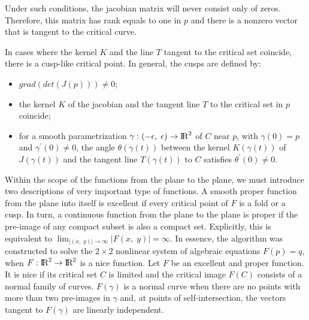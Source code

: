 \documentclass[journal=iecred,manuscript=article]{achemso}
\theoremstyle{definition}
\theoremstyle{remark}
\begin{document}
\noindent Under such conditions, the jacobian matrix will never consist only of zeros. Therefore, this matrix has rank equals to one in $ p $ and there is a nonzero vector that is tangent to the critical curve.

In cases where the kernel $ K $ and the line $ T $ tangent to the critical set coincide, there is a cusp-like critical point. In general, the cusps are defined by:
%
\begin{itemize}
\item $ grad\left(det\left(J\left(p\right)\right)\right) \neq 0 $;
\item the kernel $ K $ of the jacobian and the tangent line $ T $ to the critical set in $ p $ coincide;
\item for a smooth parametrization $ \gamma : \left( -\epsilon, \; \epsilon \right) \to \text{I\!R}^2 $ of $ C $ near $ p $, with $ \gamma \left(0\right) = p $ and $ \gamma^{\prime} \left(0\right) \neq 0 $, the angle $ \theta\left(\gamma\left(t\right)\right) $ between the kernel $ K\left(\gamma\left(t\right)\right) $ of $ J\left(\gamma\left(t\right)\right) $ and the tangent line $ T\left(\gamma\left(t\right)\right) $ to $ C $ satisfies $ \theta^{\prime}\left(0\right) \neq 0 $.
\end{itemize}

Within the scope of the functions from the plane to the plane, we must introduce two descriptions of very important type of functions. A smooth proper function from the plane into itself is excellent if every critical point of $ F $ is a fold or a cusp. In turn, a continuous function from the plane to the plane is proper if the pre-image of any compact subset is also a compact set. Explicitly, this is equivalent to $\lim_{\vert\left(x,\;y\right)\vert\to\infty} \vert F\left(x,\;y\right)\vert = \infty$. In essence, the algorithm was constructed to solve the $ 2\times2 $ nonlinear system of algebraic equations $ F\left(p\right) = q $, when $ F:\text{I\!R}^2 \to \text{I\!R}^2 $ is a nice function. Let $ F $ be an excellent and proper function. It is nice if its critical set $ C $ is limited and the critical image $ F\left(C\right) $ consists of a normal family of curves. $ F\left(\gamma\right) $  is a normal curve when there are no points with more than two pre-images in $ \gamma $ and, at points of self-intersection, the vectors tangent to $ F\left(\gamma\right) $ are linearly independent.
\end{document}
